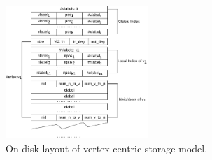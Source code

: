 \begin{figure}[ht]
  \centering
  \includegraphics[width=0.48\textwidth]{img/data_graph.pdf}
  \caption{On-disk layout of vertex-centric storage model.}\label{img:data_graph}
\end{figure}

